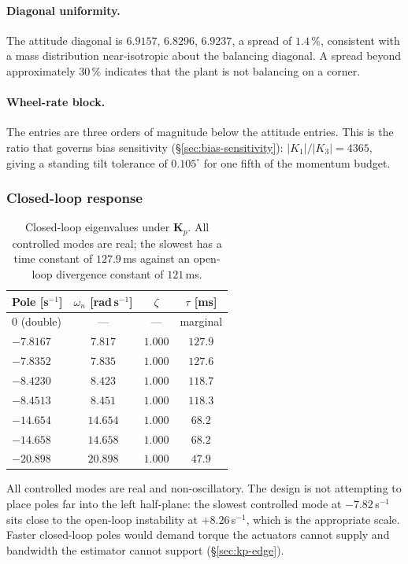 \paragraph{Diagonal uniformity.} The attitude diagonal is
$6.9157$, $6.8296$, $6.9237$, a spread of $1.4\,\%$, consistent with a mass
distribution near-isotropic about the balancing diagonal. A spread beyond
approximately $30\,\%$ indicates that the plant is not balancing on a corner.

\paragraph{Wheel-rate block.} The entries are three orders of magnitude below
the attitude entries. This is the ratio that governs bias sensitivity
(\S\ref{sec:bias-sensitivity}): $|K_1|/|K_3| = 4365$, giving a standing tilt
tolerance of $0.105^\circ$ for one fifth of the momentum budget.

\subsubsection{Closed-loop response}
\label{sec:closed-loop}

\begin{table}[htbp]
\centering
\small
\begin{tabular}{@{}lccc@{}}
\toprule
\textbf{Pole} [s$^{-1}$] & $\omega_n$ [rad\,s$^{-1}$] & $\zeta$ & $\tau$ [ms]\\
\midrule
$0$ (double) & --- & --- & marginal\\
$-7.8167$ & $7.817$ & $1.000$ & $127.9$\\
$-7.8352$ & $7.835$ & $1.000$ & $127.6$\\
$-8.4230$ & $8.423$ & $1.000$ & $118.7$\\
$-8.4513$ & $8.451$ & $1.000$ & $118.3$\\
$-14.654$ & $14.654$ & $1.000$ & $68.2$\\
$-14.658$ & $14.658$ & $1.000$ & $68.2$\\
$-20.898$ & $20.898$ & $1.000$ & $47.9$\\
\bottomrule
\end{tabular}
\caption{Closed-loop eigenvalues under $\bm{K}_p$. All controlled modes are
real; the slowest has a time constant of $127.9$\,ms against an open-loop
divergence constant of $121$\,ms.}
\label{tab:closed-loop}
\end{table}

All controlled modes are real and non-oscillatory. The design is not
attempting to place poles far into the left half-plane: the slowest
controlled mode at $-7.82$\,s$^{-1}$ sits close to the open-loop instability
at $+8.26$\,s$^{-1}$, which is the appropriate scale. Faster closed-loop
poles would demand torque the actuators cannot supply and bandwidth the
estimator cannot support (\S\ref{sec:kp-edge}).

